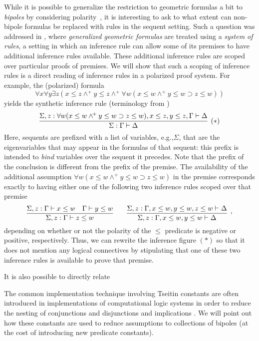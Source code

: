 \documentclass[runningheads]{llncs}
\newcommand{\eg}{e.g.,\xspace}
\newcommand{\imp}{\supset}
\newcommand{\wedgep}{\wedge^{\!+}}
\newcommand{\twoseq}[2]{#1\vdash #2}
\newcommand{\Twoseq}[3]{#1:#2\vdash #3}
\begin{document}
While it is possible to generalize the restriction to geometric
formulas a bit to \emph{bipoles} by considering
polarity~\cite{marin22apal}, it is interesting to ask to what extent
can non-bipole formulas be replaced with rules in the sequent setting.
Such a question was addressed in \cite{negri16jlc}, where
\emph{generalized geometric formulas} are treated using a \emph{system
of rules}, a setting in which an inference rule can allow some of its
premises to have additional inference rules available.  These
additional inference rules are scoped over particular proofs of
premises.
%
We will show that such a scoping of inference rules is a direct
reading of inference rules in a polarized proof system.  For example,
the (polarized) formula
\[
  \forall x\forall y\exists z(x\le z\wedgep y\le z\wedgep\forall w(x\le w\wedgep y\le w\imp z\le w)) 
\]
yields the synthetic inference rule (terminology from
\cite{marin22apal})
\[
  \infer[(*)]
        {\Twoseq{\Sigma}{\Gamma}{\Delta}}
        {\Twoseq{\Sigma,z}{\forall w(x\le w\wedgep y\le w\imp z\le w),x\le z,y\le z,\Gamma}{\Delta}}
\]
Here, sequents are prefixed with a list of variables, \eg $\Sigma$,
that are the eigenvariables that may appear in the formulas of that
sequent: this prefix is intended to \emph{bind} variables over the
sequent it precedes.  Note that the prefix of the conclusion is
different from the prefix of the premise.  The availability of the
additional assumption $\forall w(x\le w\wedgep y\le w\imp z\le w)$ in
the premise corresponds exactly to having either one of the following
two inference rules scoped over that premise
\[
  \infer
        {\Twoseq{\Sigma,z}{\Gamma}{z\le w}}
        {\Twoseq{\Sigma,z}{\Gamma}{x\le w} & \twoseq{\Gamma}{y\le w}}
  \qquad
  \infer[,]
        {\Twoseq{\Sigma,z}{\Gamma,x\le w,y\le w}{\Delta}}
        {\Twoseq{\Sigma,z}{\Gamma,x\le w,y\le w, z\le w}{\Delta}}
\]
depending on whether or not the polarity of the $\le$ predicate is
negative or positive, respectively.  Thus, we can rewrite the
inference figure $(*)$ so that it does not mention any logical
connectives by stipulating that one of these two inference rules is
available to prove that premise.

It is also possible to directly relate 

The common implementation technique involving Tseitin constants are
often introduced in implementations of computational logic systems in
order to reduce the nesting of conjunctions and disjunctions \cite{???}
and implications \cite{???}.  We will point out how these constants are
used to reduce assumptions to collections of bipoles (at the cost of
introducing new predicate constants).





\end{document}

